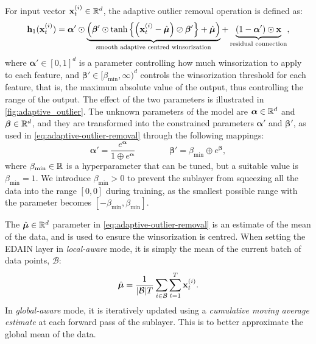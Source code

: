 \documentclass{statsmsc}
\begin{document}
{For input vector $\mathbf{x}_t^{(i)} \in \mathbb{R}^d$, the adaptive outlier removal operation is defined as:
\begin{equation}\label{eq:adaptive-outlier-removal}
    \mathbf{h}_1(\mathbf{x}_t^{(i)})=\bm\alpha' \odot \underbrace{\left(\bm\beta' \odot
        \tanh\left\{\left(\mathbf{x}_t^{(i)}-\hat{\bm\mu}\right) \oslash \bm\beta'  \right\}+\hat{\bm\mu}
\right)}_{\text{smooth adaptive centred winsorization}}
    +\underbrace{\left(1-\bm\alpha' \right) \odot \mathbf{x}}_{\text{residual connection}},
\end{equation}
where
$\bm\alpha' \in [0,1]^d$ is a parameter controlling how much winsorization to apply to each feature,
and $\bm\beta' \in [\beta_{\text{min}},\infty)^d$ controls the winsorization threshold for
each feature, that is, the maximum absolute value of the output, thus controlling the range of the
output. The effect of the two parameters is illustrated in \cref{fig:adaptive_outlier}.
The unknown parameters of the model are $\bm\alpha \in \mathbb{R}^d$ and $\bm\beta \in \mathbb{R}^d$, and they
are transformed into the constrained parameters $\bm\alpha'$ and $\bm\beta'$, as used in
\cref{eq:adaptive-outlier-removal} through the following  mappings:
\begin{equation}
    \bm\alpha'=\frac{e^{\bm\alpha}}{1\oplus e^{\bm\alpha}} \qquad\qquad
    \bm\beta'=\beta_{\text{min}}\oplus e^{\bm\beta},
\end{equation}
where $\beta_{\textrm{min}} \in \mathbb{R}$ is a hyperparameter that can be tuned, but a suitable value is $\beta_{\textrm{min}}=1$. We introduce $\beta_{\textrm{min}}>0$ to prevent the sublayer from
squeezing all the data into the range $[0,0]$ during training, as the smallest possible range
with the parameter becomes $[-\beta_{\textrm{min}}, \beta_{\textrm{min}}]$.


The $\hat{\bm\mu}\in \mathbb{R}^d$ parameter in \cref{eq:adaptive-outlier-removal} is an estimate of the mean of the data, and is used
to ensure the winsorization is centred. When setting the \ac{EDAIN} layer in \textit{local-aware}
mode, it is simply the mean of the current batch of data points, $\mathcal{B}$:
\begin{equation}
    \hat{\bm\mu}=\frac{1}{|\mathcal{B}| T} \sum_{i \in \mathcal{B}} \sum_{t=1}^T \bfx_{t}^{(i)}. %
\end{equation}
In \textit{global-aware} mode, it is iteratively updated using a \textit{cumulative
moving average estimate} at each forward pass of the sublayer.
This is to better approximate the global mean of the data.

}
\end{document}
